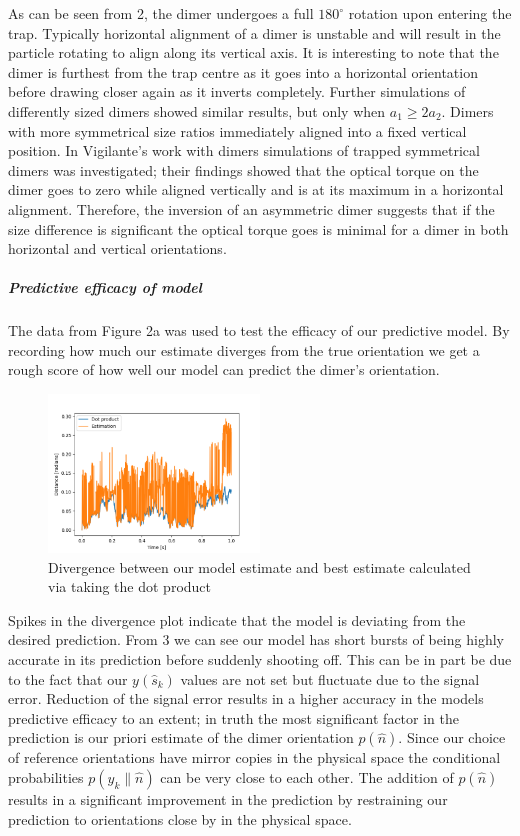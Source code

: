 \documentclass[11pt]{article}
\begin{document}
	As can be seen from \figurename{ 2}, the dimer undergoes a full $180^{\circ}$ rotation upon entering the trap. Typically horizontal alignment of a dimer is unstable and will result in the particle rotating to align along its vertical axis. It is interesting to note that the dimer is furthest from the trap centre as it goes into a horizontal orientation before drawing closer again as it inverts completely. Further simulations of differently sized dimers showed similar results, but only when $a_1 \geq 2a_2$. Dimers with more symmetrical size ratios immediately aligned into a fixed vertical position. 
	In Vigilante's work with dimers \cite{Brownian_OT} simulations of trapped symmetrical dimers was investigated; their findings showed that the optical torque on the dimer goes to zero while aligned vertically and is at its maximum in a horizontal alignment. Therefore, the inversion of an asymmetric dimer suggests that if the size difference is significant the optical torque goes is minimal for a dimer in both horizontal and vertical orientations. 
	
	\subparagraph*{Predictive efficacy of model}
	The data from Figure 2a was used to test the efficacy of our predictive model. By recording how much our estimate diverges from the true orientation we get a rough score of how well our model can predict the dimer's orientation.
	
	\begin{figure}[h]
		\centering
		\includegraphics[width=0.5\textwidth]{Divergance.png}
		\caption{Divergence between our model estimate and best estimate calculated via taking the dot product}
	\end{figure}
	
	Spikes in the divergence plot indicate that the model is deviating from the desired prediction. From \figurename{ 3} we can see our model has short bursts of being highly accurate in its prediction before suddenly shooting off. This can be in part be due to the fact that our $y(\hat{s}_k)$ values are not set but fluctuate due to the signal error. Reduction of the signal error results in a higher accuracy in the models predictive efficacy to an extent; in truth the most significant factor in the prediction is our priori estimate of the dimer orientation $p(\hat{n})$. Since our choice of reference orientations have mirror copies in the physical space the conditional probabilities $p(y_k\parallel\hat{n})$ can be very close to each other. The addition of $p(\hat{n})$ results in a significant improvement in the prediction by restraining our prediction to orientations close by in the physical space. 
	
\end{document}
